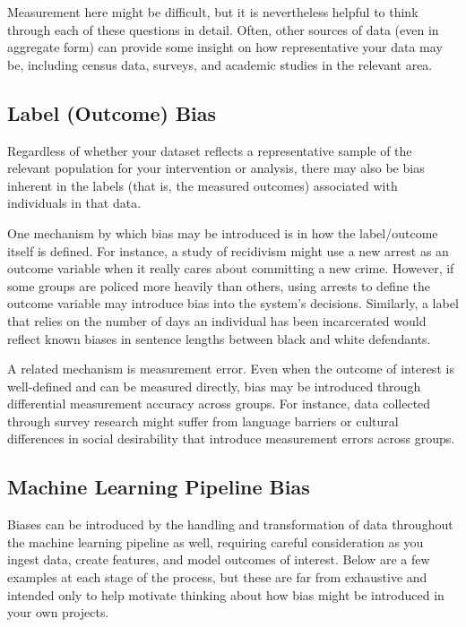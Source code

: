 \documentclass[]{krantz}
\begin{document}
Measurement here might be difficult, but it is nevertheless helpful to
think through each of these questions in detail. Often, other sources of
data (even in aggregate form) can provide some insight on how
representative your data may be, including census data, surveys, and
academic studies in the relevant area.

\subsection{Label (Outcome) Bias}\label{label-outcome-bias}

Regardless of whether your dataset reflects a representative sample of
the relevant population for your intervention or analysis, there may
also be bias inherent in the labels (that is, the measured outcomes)
associated with individuals in that data.

One mechanism by which bias may be introduced is in how the
label/outcome itself is defined. For instance, a study of recidivism
might use a new arrest as an outcome variable when it really cares about
committing a new crime. However, if some groups are policed more heavily
than others, using arrests to define the outcome variable may introduce
bias into the system's decisions. Similarly, a label that relies on the
number of days an individual has been incarcerated would reflect known
biases in sentence lengths between black and white defendants.

A related mechanism is measurement error. Even when the outcome of
interest is well-defined and can be measured directly, bias may be
introduced through differential measurement accuracy across groups. For
instance, data collected through survey research might suffer from
language barriers or cultural differences in social desirability that
introduce measurement errors across groups.

\hypertarget{sec:mlbiasexamples}{\subsection{Machine Learning Pipeline
Bias}\label{sec:mlbiasexamples}}

Biases can be introduced by the handling and transformation of data
throughout the machine learning pipeline as well, requiring careful
consideration as you ingest data, create features, and model outcomes of
interest. Below are a few examples at each stage of the process, but
these are far from exhaustive and intended only to help motivate
thinking about how bias might be introduced in your own projects.
\end{document}
